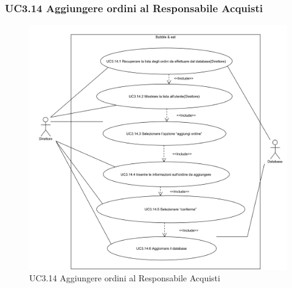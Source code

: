 \subsubsection{UC3.14 Aggiungere ordini al Responsabile Acquisti} \label{UC3.14}

\begin{figure}[H]
	\centering
	\includegraphics[width=15cm]{../../documenti/AnalisiDeiRequisiti/Diagrammi_img/uc3_14.png}
	\caption{UC3.14 Aggiungere ordini al Responsabile Acquisti}
\end{figure}

